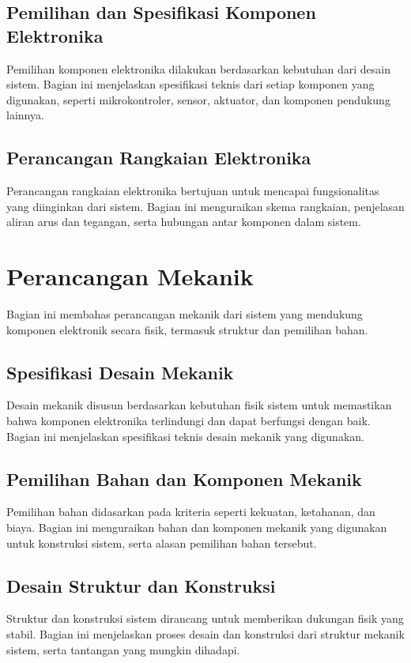 \subsection{Pemilihan dan Spesifikasi Komponen Elektronika}
Pemilihan komponen elektronika dilakukan berdasarkan kebutuhan dari desain sistem. Bagian ini menjelaskan spesifikasi teknis dari setiap komponen yang digunakan, seperti mikrokontroler, sensor, aktuator, dan komponen pendukung lainnya.

\subsection{Perancangan Rangkaian Elektronika}
Perancangan rangkaian elektronika bertujuan untuk mencapai fungsionalitas yang diinginkan dari sistem. Bagian ini menguraikan skema rangkaian, penjelasan aliran arus dan tegangan, serta hubungan antar komponen dalam sistem.

\section{Perancangan Mekanik}
Bagian ini membahas perancangan mekanik dari sistem yang mendukung komponen elektronik secara fisik, termasuk struktur dan pemilihan bahan.

\subsection{Spesifikasi Desain Mekanik}
Desain mekanik disusun berdasarkan kebutuhan fisik sistem untuk memastikan bahwa komponen elektronika terlindungi dan dapat berfungsi dengan baik. Bagian ini menjelaskan spesifikasi teknis desain mekanik yang digunakan.

\subsection{Pemilihan Bahan dan Komponen Mekanik}
Pemilihan bahan didasarkan pada kriteria seperti kekuatan, ketahanan, dan biaya. Bagian ini menguraikan bahan dan komponen mekanik yang digunakan untuk konstruksi sistem, serta alasan pemilihan bahan tersebut.

\subsection{Desain Struktur dan Konstruksi}
Struktur dan konstruksi sistem dirancang untuk memberikan dukungan fisik yang stabil. Bagian ini menjelaskan proses desain dan konstruksi dari struktur mekanik sistem, serta tantangan yang mungkin dihadapi.

